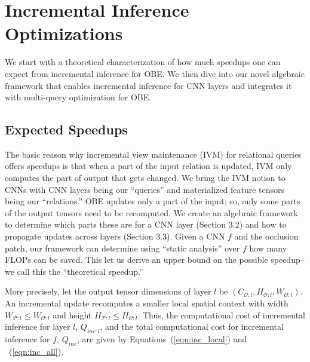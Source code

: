 \section{Incremental Inference Optimizations}\label{sec:exact}
We start with a theoretical characterization of how much speedups one can expect from incremental inference for OBE. We then dive into our novel algebraic framework that enables incremental inference for CNN layers and integrates it with multi-query optimization for OBE.


\subsection{Expected Speedups}
The basic reason why incremental view maintenance (IVM) for relational queries offers speedups is that when a part of the input relation is updated, IVM only computes the part of output that gets changed. We bring the IVM notion to CNNs with CNN layers being our ``queries'' and materialized feature tensors being our ``relations.'' OBE updates only a part of the input; so, only some parts of the output tensors need to be recomputed. We create an algebraic framework to determine which parts these are for a CNN layer (Section 3.2) and how to propagate updates across layers (Section 3.3). Given a CNN $f$ and the occlusion patch, our framework can determine using ``static analysis'' over $f$ how many FLOPs can be saved. This let us derive an upper bound on the possible speedup--we call this the ``theoretical speedup.''

More precisely, let the output tensor dimensions of layer $l$ be $(C_{\mathcal{O}:l} , H_{\mathcal{O}:l} , W_{\mathcal{O}:l})$. An incremental update recomputes a smaller local spatial context with width $W_{\mathcal{P}:l} \le W_{\mathcal{O}:l}$ and height $H_{\mathcal{P}:l} \le H_{\mathcal{O}:l}$. Thus, the computational cost of incremental inference for layer $l$, $Q_{inc:l}$, and the total computational cost for incremental inference for $f$, $Q_{inc}$, are given by Equations~(\ref{eqn:inc_local}) and ~(\ref{eqn:inc_all}).

